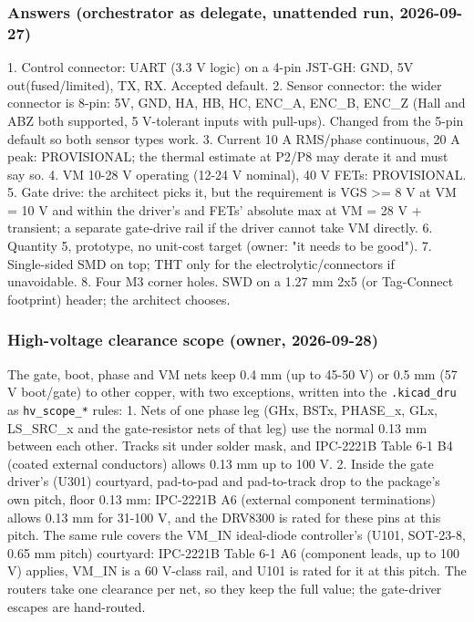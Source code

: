 \documentclass[11pt,a4paper]{article}
\begin{document}
\subsubsection*{Answers (orchestrator as delegate, unattended run, 2026-09-27)}
1. Control connector: UART (3.3 V logic) on a 4-pin JST-GH: GND, 5V out(fused/limited), TX, RX. Accepted default. 2. Sensor connector: the wider connector is 8-pin: 5V, GND, HA, HB, HC, ENC\_A, ENC\_B, ENC\_Z (Hall and ABZ both supported, 5 V-tolerant inputs with pull-ups). Changed from the 5-pin default so both sensor types work. 3. Current 10 A RMS/phase continuous, 20 A peak: PROVISIONAL; the thermal estimate at P2/P8 may derate it and must say so. 4. VM 10-28 V operating (12-24 V nominal), 40 V FETs: PROVISIONAL. 5. Gate drive: the architect picks it, but the requirement is VGS \textgreater{}= 8 V at VM = 10 V and within the driver's and FETs' absolute max at VM = 28 V + transient; a separate gate-drive rail if the driver cannot take VM directly. 6. Quantity 5, prototype, no unit-cost target (owner: "it needs to be good"). 7. Single-sided SMD on top; THT only for the electrolytic/connectors if unavoidable. 8. Four M3 corner holes. SWD on a 1.27 mm 2x5 (or Tag-Connect footprint) header; the architect chooses.

\subsubsection*{High-voltage clearance scope (owner, 2026-09-28)}
The gate, boot, phase and VM nets keep 0.4 mm (up to 45-50 V) or 0.5 mm (57 V boot/gate) to other copper, with two exceptions, written into the \texttt{.kicad\_dru} as \texttt{hv\_scope\_{*}} rules: 1. Nets of one phase leg (GHx, BSTx, PHASE\_x, GLx, LS\_SRC\_x and the gate-resistor nets of that leg) use the normal 0.13 mm between each other. Tracks sit under solder mask, and IPC-2221B Table 6-1 B4 (coated external conductors) allows 0.13 mm up to 100 V. 2. Inside the gate driver's (U301) courtyard, pad-to-pad and pad-to-track drop to the package's own pitch, floor 0.13 mm: IPC-2221B A6 (external component terminations) allows 0.13 mm for 31-100 V, and the DRV8300 is rated for these pins at this pitch. The same rule covers the VM\_IN ideal-diode controller's (U101, SOT-23-8, 0.65 mm pitch) courtyard: IPC-2221B Table 6-1 A6 (component leads, up to 100 V) applies, VM\_IN is a 60 V-class rail, and U101 is rated for it at this pitch. The routers take one clearance per net, so they keep the full value; the gate-driver escapes are hand-routed.
\end{document}
